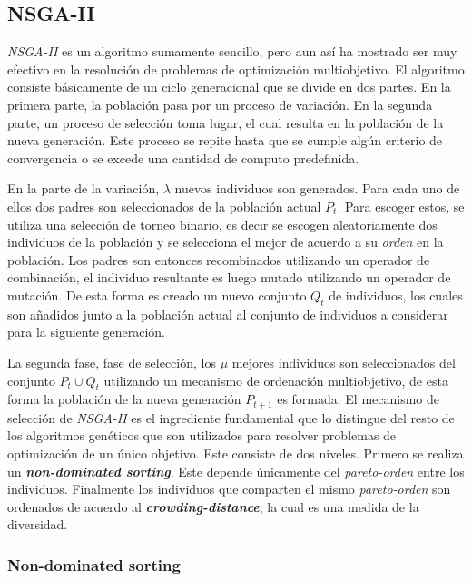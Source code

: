 \subsection*{NSGA-II}

\emph{NSGA-II} es un algoritmo sumamente sencillo, pero aun así ha mostrado ser muy efectivo en la resolución de problemas de optimización multiobjetivo.
El algoritmo consiste básicamente de un ciclo generacional que se divide en dos partes.
En la primera parte, la población pasa por un proceso de variación.
En la segunda parte, un proceso de selección toma lugar, el cual resulta en la población de la nueva generación.
Este proceso se repite hasta que se cumple algún criterio de convergencia o se excede una cantidad de computo predefinida.

En la parte de la variación, $\lambda$ nuevos individuos son generados.
Para cada uno de ellos dos padres son seleccionados de la población actual $P_t$.
Para escoger estos, se utiliza una selección de torneo binario, es decir se escogen aleatoriamente dos individuos de la población y se selecciona el mejor de acuerdo a su \emph{orden} en la población.
Los padres son entonces recombinados utilizando un operador de combinación, el individuo resultante es luego mutado utilizando un operador de mutación.
De esta forma es creado un nuevo conjunto $Q_t$ de individuos, los cuales son añadidos junto a la población actual al conjunto de individuos a considerar para la siguiente generación.

La segunda fase, fase de selección, los $\mu$ mejores individuos son seleccionados del conjunto $P_t \cup Q_t$ utilizando un mecanismo de ordenación multiobjetivo, de esta forma la población de la nueva generación $P_{t+1}$ es formada.
El mecanismo de selección de \emph{NSGA-II} es el ingrediente fundamental que lo distingue del resto de los algoritmos genéticos que son utilizados para resolver problemas de optimización de un único objetivo.
Este consiste de dos niveles.
Primero se realiza un \emph{\textbf{non-dominated sorting}}.
Este depende únicamente del \emph{pareto-orden} entre los individuos.
Finalmente los individuos que comparten el mismo \emph{pareto-orden} son ordenados de acuerdo al \emph{\textbf{crowding-distance}}, la cual es una medida de la diversidad.


\subsubsection{Non-dominated sorting}\label{section:ndsorting}

